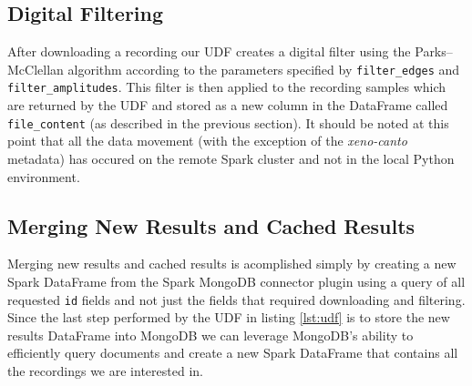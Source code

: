 \documentclass[conference,twoside]{IEEEtran}
\newcommand{\code}[1]{\texttt{#1}}
\begin{document}
\subsection{Digital Filtering}
After downloading a recording our UDF creates a digital filter using the Parks–McClellan algorithm\cite{dsp} according to the parameters specified by \code{filter\_edges} and \code{filter\_amplitudes}. This filter is then applied to the recording samples which are returned by the UDF and stored as a new column in the DataFrame called \code{file\_content} (as described in the previous section). It should be noted at this point that all the data movement (with the exception of the \textit{xeno-canto} metadata) has occured on the remote Spark cluster and not in the local Python environment.

\subsection{Merging New Results and Cached Results}
Merging new results and cached results is acomplished simply by creating a new Spark DataFrame from the Spark MongoDB connector plugin using a query of all requested \code{id} fields and not just the fields that required downloading and filtering. Since the last step performed by the UDF in listing \ref{lst:udf} is to store the new results DataFrame into MongoDB we can leverage MongoDB's ability to efficiently query documents and create a new Spark DataFrame that contains all the recordings we are interested in.

\end{document}
